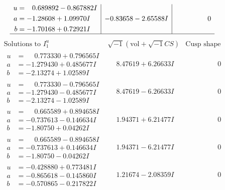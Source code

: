 \documentclass[1p]{elsarticle_modified}
\theoremstyle{definition}
\newcommand{\I}{\sqrt{-1}}
\begin{document}
$$\begin{array}{c|c|c}
\begin{aligned}
u &= \phantom{-}0.689892 - 0.867882 I \\
a &= -1.28608 + 1.09970 I \\
b &= -1.70168 + 0.72921 I\end{aligned}
 & -0.83658 - 2.65588 I & \phantom{-0.000000 } 0\\
 \hline 
 \end{array}$$\newpage$$\begin{array}{c|c|c}  
\text{Solutions to }I^u_{1}& \I (\text{vol} + \sqrt{-1}CS) & \text{Cusp shape}\\
 \hline 
\begin{aligned}
u &= \phantom{-}0.773330 + 0.796565 I \\
a &= -1.279430 + 0.485677 I \\
b &= -2.13274 + 1.02589 I\end{aligned}
 & \phantom{-}8.47619 + 6.26633 I & \phantom{-0.000000 } 0 \\ \hline\begin{aligned}
u &= \phantom{-}0.773330 - 0.796565 I \\
a &= -1.279430 - 0.485677 I \\
b &= -2.13274 - 1.02589 I\end{aligned}
 & \phantom{-}8.47619 - 6.26633 I & \phantom{-0.000000 } 0 \\ \hline\begin{aligned}
u &= \phantom{-}0.665589 + 0.894658 I \\
a &= -0.737613 - 0.146634 I \\
b &= -1.80750 + 0.04262 I\end{aligned}
 & \phantom{-}1.94371 + 6.21477 I & \phantom{-0.000000 } 0 \\ \hline\begin{aligned}
u &= \phantom{-}0.665589 - 0.894658 I \\
a &= -0.737613 + 0.146634 I \\
b &= -1.80750 - 0.04262 I\end{aligned}
 & \phantom{-}1.94371 - 6.21477 I & \phantom{-0.000000 } 0 \\ \hline\begin{aligned}
u &= -0.428880 + 0.773481 I \\
a &= -0.865618 - 0.145860 I \\
b &= -0.570865 - 0.217822 I\end{aligned}
 & \phantom{-}1.21674 - 2.08359 I & \phantom{-0.000000 } 0 \\ \hline\begin{aligned}

\end{aligned}
\end{array}$$
\end{document}

